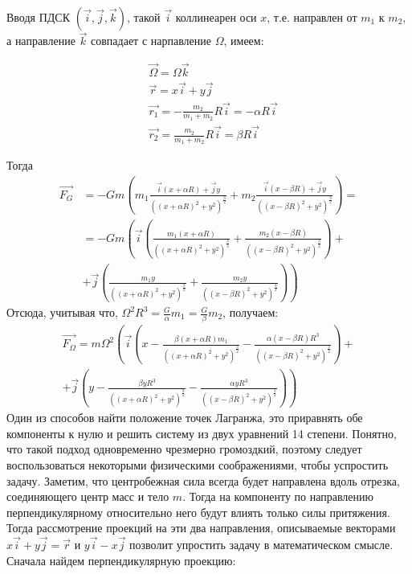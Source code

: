 \documentclass[a4paper]{article} %
\begin{document}
Вводя ПДСК $(\vec{i}, \vec{j}, \vec{k})$, такой $\vec{i}$ коллинеарен оси $x$, т.е. направлен от $m_1$ к $m_2$, а направление $\vec{k}$ совпадает с нарпавление $\Omega$, имеем:
\begin{center}
\begin{equation}
\begin{split}
&\vec{\Omega} = \Omega\vec{k} \\
&\vec{r} = x\vec{i} + y\vec{j} \\
&\vec{r_1} = -\frac{m_2}{m_1 + m_2}R\vec{i} = -\alpha R\vec{i} \\
&\vec{r_2} = \frac{m_2}{m_1 + m_2}R\vec{i} = \beta R\vec{i}
\end{split}
\end{equation}
\end{center}
Тогда
\begin{equation}
\begin{split}
\vec{F_G} &= -Gm(m_1\frac{\vec{i}(x + \alpha R) + \vec{j}y}{((x + \alpha R)^2 + y^2)^\frac{3}{2}} + m_2\frac{\vec{i}(x - \beta R) + \vec{j}y}{((x - \beta R)^2 + y^2)^\frac{3}{2}}) = \\
&= -Gm\left(\vec{i}\left(\frac{m_1(x + \alpha R)}{((x + \alpha R)^2 + y^2)^\frac{3}{2}} + \frac{m_2(x - \beta R)}{((x - \beta R)^2 + y^2)^\frac{3}{2}}\right) + \right. \\
&\left. +\vec{j}\left(\frac{m_1y}{((x + \alpha R)^2 + y^2)^\frac{3}{2}} + \frac{m_2y}{((x - \beta R)^2 + y^2)^\frac{3}{2}}\right) \right)
\end{split}
\end{equation}
Отсюда, учитывая что, $\Omega^2R^3 = \frac{G}{\alpha}m_1 = \frac{G}{\beta}m_2$, получаем:
\begin{equation}
\begin{split}
\vec{F_\Omega} = m\Omega^2\left(\vec{i}\left(x - \frac{\beta(x + \alpha R)m_1}{((x + \alpha R)^2 + y^2)^\frac{3}{2}} - \frac{\alpha(x - \beta R)R^3}{((x - \beta R)^2 + y^2)^\frac{3}{2}}\right) + \right. \\
\left. +\vec{j}\left(y - \frac{\beta yR^3}{((x + \alpha R)^2 + y^2)^\frac{3}{2}} - \frac{\alpha yR^3}{((x - \beta R)^2 + y^2)^\frac{3}{2}}\right) \right)
\end{split}
\label{11}
\end{equation}
Один из способов найти положение точек Лагранжа, это приравнять обе компоненты к нулю и решить систему из двух уравнений 14 степени. Понятно, что такой подход одновременно чрезмерно громоздкий, поэтому следует воспользоваться некоторыми физическими соображениями, чтобы успростить задачу. Заметим, что центробежная сила всегда будет направлена вдоль отрезка, соединяющего центр масс и тело $m$. Тогда на компоненту по направлению перпендикулярному относительно него будут влиять только силы притяжения. Тогда рассмотрение проекций на эти два направления, описываемые векторами $x\vec{i} + y\vec{j} = \vec{r}$ и $y\vec{i} - x\vec{j}$ позволит упростить задачу в математическом смысле. Сначала найдем перпендикулярную проекцию:
\end{document}
